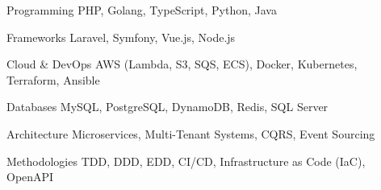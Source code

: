 

\begin{cvskills}

  \cvskill
    {Programming} %
    {PHP, Golang, TypeScript, Python, Java} %

  \cvskill
    {Frameworks} %
    {Laravel, Symfony, Vue.js, Node.js} %

  \cvskill
    {Cloud \& DevOps} %
    {AWS (Lambda, S3, SQS, ECS), Docker, Kubernetes, Terraform, Ansible} %

  \cvskill
    {Databases} %
    {MySQL, PostgreSQL, DynamoDB, Redis, SQL Server} %

  \cvskill
    {Architecture} %
    {Microservices, Multi-Tenant Systems, CQRS, Event Sourcing} %

  \cvskill
    {Methodologies} %
    {TDD, DDD, EDD, CI/CD, Infrastructure as Code (IaC), OpenAPI} %

\end{cvskills} 